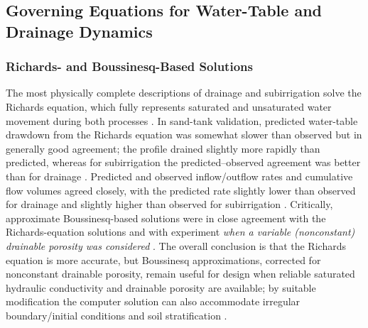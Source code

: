 \documentclass[11pt]{article}
\begin{document}
\subsection{Governing Equations for Water-Table and Drainage Dynamics}

\subsubsection{Richards- and Boussinesq-Based Solutions}

The most physically complete descriptions of drainage and subirrigation solve the
Richards equation, which fully represents saturated and unsaturated water movement during
both processes \parencite{TANG1977}. In sand-tank validation, predicted water-table
drawdown from the Richards equation was somewhat slower than observed but in generally
good agreement; the profile drained slightly more rapidly than predicted, whereas for
subirrigation the predicted--observed agreement was better than for drainage
\parencite{TANG1977}. Predicted and observed inflow/outflow rates and cumulative flow
volumes agreed closely, with the predicted rate slightly lower than observed for drainage
and slightly higher than observed for subirrigation \parencite{TANG1977}. Critically,
approximate Boussinesq-based solutions were in close agreement with the Richards-equation
solutions and with experiment \emph{when a variable (nonconstant) drainable porosity was
considered} \parencite{TANG1977}. The overall conclusion is that the Richards equation is
more accurate, but Boussinesq approximations, corrected for nonconstant drainable
porosity, remain useful for design when reliable saturated hydraulic conductivity and
drainable porosity are available; by suitable modification the computer solution can also
accommodate irregular boundary/initial conditions and soil stratification
\parencite{TANG1977}.
\end{document}
